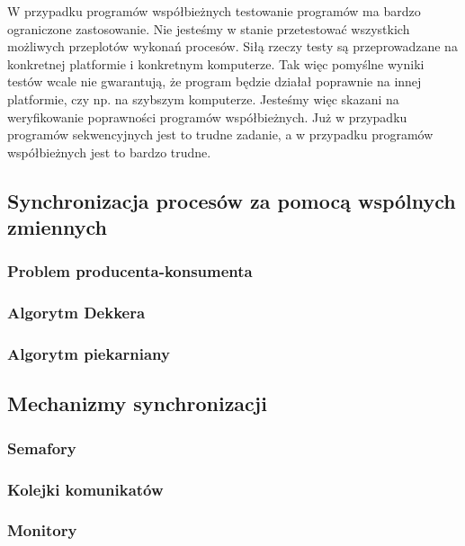 W przypadku programów współbieżnych testowanie programów ma bardzo ograniczone zastosowanie.
Nie jesteśmy w stanie przetestować wszystkich możliwych przeplotów wykonań procesów.
Siłą rzeczy testy są przeprowadzane na konkretnej platformie i konkretnym komputerze.
Tak więc pomyślne wyniki testów wcale nie gwarantują, że program będzie działał poprawnie na innej platformie,
czy np. na szybszym komputerze.
Jesteśmy więc skazani na weryfikowanie poprawności programów współbieżnych.
Już w przypadku programów sekwencyjnych jest to trudne zadanie,
a w przypadku programów współbieżnych jest to bardzo trudne.

\subsection{Synchronizacja procesów za pomocą wspólnych zmiennych}

\subsubsection{Problem producenta-konsumenta}
\subsubsection{Algorytm Dekkera}
\subsubsection{Algorytm piekarniany}

\subsection{Mechanizmy synchronizacji}

\subsubsection{Semafory}
\subsubsection{Kolejki komunikatów}
\subsubsection{Monitory}